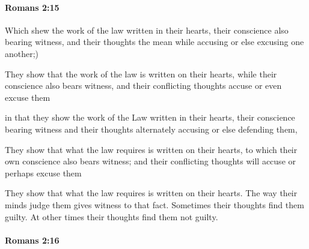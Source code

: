 		\paragraph{Romans 2:15} %
			\label{ROMANS-2-15}

			Which shew the work of the law written in their hearts, their conscience also bearing witness, and their thoughts the mean while accusing or else excusing one another;)

			\begin{framed}
			\scriptsize
				\begin{compactdesc}
					\item[SBLG] 
					\item[ESV] They show that the work of the law is written on their hearts, while their conscience also bears witness, and their conflicting thoughts accuse or even excuse them
					\item[NASB] in that they show the work of the Law written in their hearts, their conscience bearing witness and their thoughts alternately accusing or else defending them,
					\item[NRSV] They show that what the law requires is written on their hearts, to which their own conscience also bears witness; and their conflicting thoughts will accuse or perhaps excuse them
					\item[NIRV] They show that what the law requires is written on their hearts. The way their minds judge them gives witness to that fact. Sometimes their thoughts find them guilty. At other times their thoughts find them not guilty.
				\end{compactdesc}
			\end{framed}

		\paragraph{Romans 2:16} %
			\label{ROMANS-2-16}

